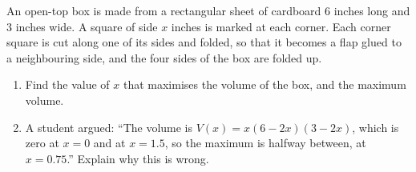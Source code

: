 An open-top box is made from a rectangular sheet of cardboard $6$ inches long and $3$ inches wide. A square of side $x$ inches is marked at each corner. Each corner square is cut along one of its sides and folded, so that it becomes a flap glued to a neighbouring side, and the four sides of the box are folded up.
\begin{enumerate}
\item[(a)] Find the value of $x$ that maximises the volume of the box, and the maximum volume.
\item[(b)] A student argued: ``The volume is $V(x)=x(6-2x)(3-2x)$, which is zero at $x=0$ and at $x=1.5$, so the maximum is halfway between, at $x=0.75$.'' Explain why this is wrong.
\end{enumerate}
